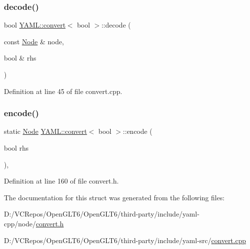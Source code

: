 \subsubsection{\texorpdfstring{decode()}{decode()}}
{\footnotesize\ttfamily bool \mbox{\hyperlink{struct_y_a_m_l_1_1convert}{Y\+A\+M\+L\+::convert}}$<$ bool $>$\+::decode (\begin{DoxyParamCaption}\item[{const \mbox{\hyperlink{class_y_a_m_l_1_1_node}{Node}} \&}]{node,  }\item[{bool \&}]{rhs }\end{DoxyParamCaption})\hspace{0.3cm}{\ttfamily [static]}}



Definition at line 45 of file convert.\+cpp.

\mbox{\label{struct_y_a_m_l_1_1convert_3_01bool_01_4_accf9335d8cf7bc9698c47de0c91d111d}} 
\subsubsection{\texorpdfstring{encode()}{encode()}}
{\footnotesize\ttfamily static \mbox{\hyperlink{class_y_a_m_l_1_1_node}{Node}} \mbox{\hyperlink{struct_y_a_m_l_1_1convert}{Y\+A\+M\+L\+::convert}}$<$ bool $>$\+::encode (\begin{DoxyParamCaption}\item[{bool}]{rhs }\end{DoxyParamCaption})\hspace{0.3cm}{\ttfamily [inline]}, {\ttfamily [static]}}



Definition at line 160 of file convert.\+h.



The documentation for this struct was generated from the following files\+:\begin{DoxyCompactItemize}
\item 
D\+:/\+V\+C\+Repos/\+Open\+G\+L\+T6/\+Open\+G\+L\+T6/third-\/party/include/yaml-\/cpp/node/\mbox{\hyperlink{convert_8h}{convert.\+h}}\item 
D\+:/\+V\+C\+Repos/\+Open\+G\+L\+T6/\+Open\+G\+L\+T6/third-\/party/include/yaml-\/src/\mbox{\hyperlink{convert_8cpp}{convert.\+cpp}}\end{DoxyCompactItemize}
